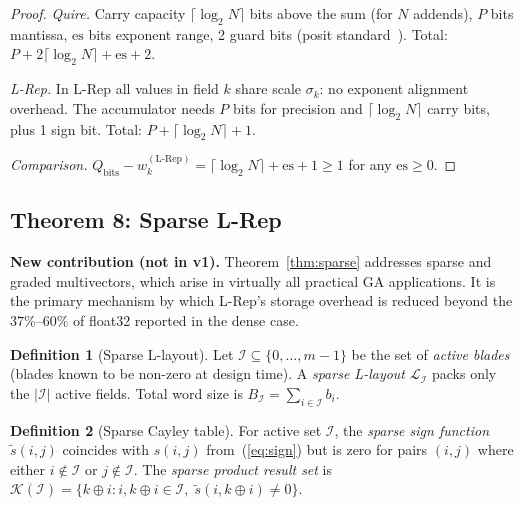 \documentclass[11pt,a4paper]{article}
\theoremstyle{definition}
\newtheorem{definition}{Definition}[section]
\theoremstyle{plain}
\theoremstyle{remark}
\begin{document}
\begin{proof}
\emph{Quire.}
Carry capacity $\lceil\log_2 N\rceil$ bits above the sum (for $N$
addends), $P$ bits mantissa, $\mathrm{es}$ bits exponent range,
2 guard bits (posit standard~\cite{gustafson2017}).
Total: $P + 2\lceil\log_2 N\rceil + \mathrm{es} + 2$.

\emph{L-Rep.}
In L-Rep all values in field $k$ share scale $\sigma_k$:
no exponent alignment overhead.
The accumulator needs $P$ bits for precision and
$\lceil\log_2 N\rceil$ carry bits, plus 1 sign bit.
Total: $P + \lceil\log_2 N\rceil + 1$.

\emph{Comparison.}
$Q_\mathrm{bits} - w_k^{(\mathrm{L\text{-}Rep})}
  = \lceil\log_2 N\rceil + \mathrm{es} + 1 \ge 1$
for any $\mathrm{es} \ge 0$.
\end{proof}

\subsection{Theorem 8: Sparse L-Rep}
\label{sec:sparse}

\begin{warningbox}
\textbf{New contribution (not in v1).}
Theorem~\ref{thm:sparse} addresses sparse and graded multivectors,
which arise in virtually all practical GA applications.
It is the primary mechanism by which L-Rep's storage overhead is
reduced beyond the $37\%$--$60\%$ of float32 reported in the dense case.
\end{warningbox}

\begin{definition}[Sparse L-layout]
\label{def:sparse-layout}
Let $\mathcal{I} \subseteq \{0, \ldots, m-1\}$ be the set of
\emph{active blades} (blades known to be non-zero at design time).
A \emph{sparse L-layout} $\mathcal{L}_{\mathcal{I}}$ packs only the
$|\mathcal{I}|$ active fields.
Total word size is $B_{\mathcal{I}} = \sum_{i \in \mathcal{I}} b_i$.
\end{definition}

\begin{definition}[Sparse Cayley table]
For active set $\mathcal{I}$, the \emph{sparse sign function}
$\tilde{s}(i,j)$ coincides with $s(i,j)$ from~(\ref{eq:sign}) but is
zero for pairs $(i,j)$ where either $i \notin \mathcal{I}$ or
$j \notin \mathcal{I}$.
The \emph{sparse product result set} is
$\mathcal{K}(\mathcal{I}) = \{k \oplus i : i, k\oplus i \in \mathcal{I},\;
  \tilde{s}(i,k\oplus i) \ne 0\}$.
\end{definition}
\end{document}
